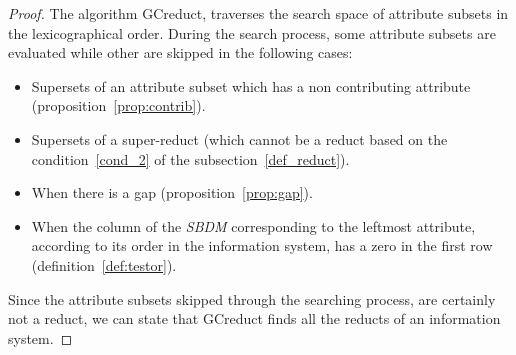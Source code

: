 \documentclass[number,preprint,review,12pt]{elsarticle}
\newtheorem{proof}{Proof}
\begin{document}
	\begin{proof}
		The algorithm GCreduct, traverses the search space of attribute subsets in the lexicographical order. During the search process, some attribute subsets are evaluated while other are skipped in the following cases:
		\begin{itemize}
			\item Supersets of an attribute subset which has a non contributing attribute (proposition~\ref{prop:contrib}).
			\item Supersets of a super-reduct (which cannot be a reduct based on the condition~\ref{cond_2} of the subsection~\ref{def_reduct}).
			\item When there is a gap (proposition~\ref{prop:gap}).
			\item When the column of the \textit{SBDM} corresponding to the leftmost attribute, according to its order in the information system, has a zero in the first row (definition~\ref{def:testor}).
		\end{itemize} 
		Since the attribute subsets skipped through the searching process, are certainly not a reduct, we can state that GCreduct finds all the reducts of an information system.
	\end{proof}
	
		
\end{document}
